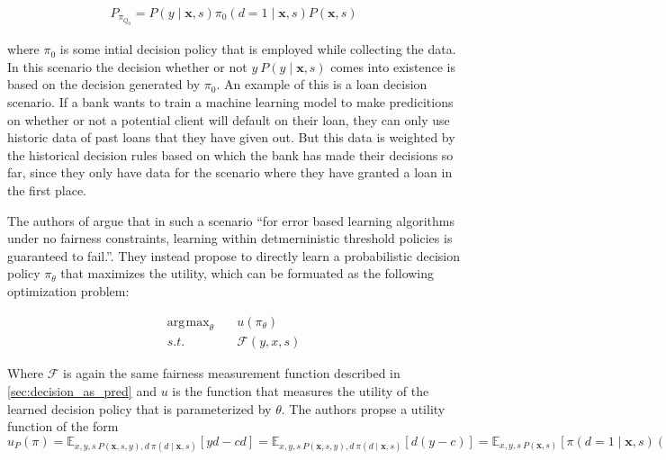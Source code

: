\documentclass[
	a4paper,
	11pt
	]{article}
\DeclareMathOperator*{\argmax}{\arg\!\max}
\begin{document}
\begin{align*}
    P_{\pi_{Q_{0}}} = P(y \mid \boldsymbol{x}, s)\pi_{0}(d = 1 \mid \boldsymbol{x}, s)P(\boldsymbol{x}, s)
\end{align*}

where $\pi_{0}$ is some intial decision policy that is employed while collecting the data. In this scenario the decision whether or not $y ~ P(y \mid \boldsymbol{x}, s)$ comes into existence is based on the decision generated by $\pi_{0}$. An example of this is a loan decision scenario. If a bank wants to train a machine learning model to make predicitions on whether or not a potential client will default on their loan, they can only use historic data of past loans that they have given out. But this data is weighted by the historical decision rules based on which the bank has made their decisions so far, since they only have data for the scenario where they have granted a loan in the first place.

The authors of \cite{Kilbertus19} argue that in such a scenario \enquote{for error based learning algorithms under no fairness constraints, learning within detmerninistic threshold policies is guaranteed to fail.}. They instead propose to directly learn a probabilistic decision policy $\pi_{\theta}$ that maximizes the utility, which can be formuated as the following optimization problem:

\begin{align*}
    \argmax_{\theta} &\quad u(\pi_{\theta}) \\
    s.t. &\quad \mathcal{F}(y, x, s)
\end{align*}

Where $\mathcal{F}$ is again the same fairness measurement function described in \ref{sec:decision_as_pred} and $u$ is the function that measures the utility of the learned decision policy that is parameterized by $\theta$. The authors propse a utility function of the form $u_P(\pi) = \mathbb{E}_{x,y,s ~ P(\boldsymbol{x}, s, y), d ~ \pi(d \mid \boldsymbol{x}, s)}[yd - cd] = \mathbb{E}_{x,y,s ~ P(\boldsymbol{x}, s, y), d ~ \pi(d \mid \boldsymbol{x}, s)}[d(y - c)] = \mathbb{E}_{x,y,s ~ P(\boldsymbol{x}, s)}[\pi(d = 1 \mid \boldsymbol{x}, s)(P(y = 1 \mid \boldsymbol{x}, s) - c)]$


\end{document}
